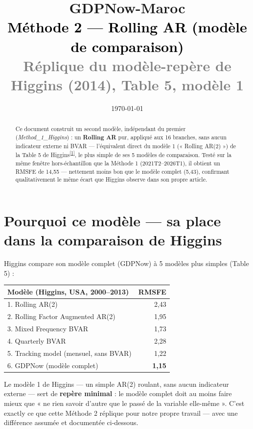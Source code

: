 \documentclass[11pt,a4paper]{article}
\title{\vspace{-1.3cm}\textcolor{violetmethode}{\Huge\bfseries GDPNow-Maroc}\\[0.3cm]
\textcolor{black}{\Large Méthode 2 --- Rolling AR (modèle de comparaison)}\\[0.15cm]
\textcolor{gray}{\large Réplique du modèle-repère de Higgins (2014), Table 5, modèle 1}}
\author{}
\date{\today}
\newcommand{\cit}[1]{\textsuperscript{\hyperlink{ref#1}{[#1]}}}
\begin{document}
\maketitle
\thispagestyle{empty}

\begin{abstract}
\noindent Ce document construit un second modèle, indépendant du premier (\emph{Method\_1\_Higgins}) : un \textbf{Rolling AR} pur, appliqué aux 16 branches, sans aucun indicateur externe ni BVAR --- l'équivalent direct du modèle 1 (« Rolling AR(2) ») de la Table 5 de Higgins\cit{1}, le plus simple de ses 5 modèles de comparaison. Testé sur la même fenêtre hors-échantillon que la Méthode 1 (2021T2--2026T1), il obtient un RMSFE de 14,55 --- nettement moins bon que le modèle complet (5,43), confirmant qualitativement le même écart que Higgins observe dans son propre article.
\end{abstract}

\tableofcontents
\vspace{0.5cm}

\section{Pourquoi ce modèle --- sa place dans la comparaison de Higgins}

\begin{definitionbox}
Higgins compare son modèle complet (GDPNow) à 5 modèles plus simples (Table 5) :
\begin{center}
\small
\begin{tabular}{lr}
\toprule
\textbf{Modèle (Higgins, USA, 2000--2013)} & \textbf{RMSFE} \\
\midrule
1. Rolling AR(2) & 2,43 \\
2. Rolling Factor Augmented AR(2) & 1,95 \\
3. Mixed Frequency BVAR & 1,73 \\
4. Quarterly BVAR & 2,28 \\
5. Tracking model (mensuel, sans BVAR) & 1,22 \\
6. GDPNow (modèle complet) & \textbf{1,15} \\
\bottomrule
\end{tabular}
\end{center}
\end{definitionbox}

\begin{intuition}
Le modèle 1 de Higgins --- un simple AR(2) roulant, sans aucun indicateur externe --- sert de \textbf{repère minimal} : le modèle complet doit au moins faire mieux que « ne rien savoir d'autre que le passé de la variable elle-même ». C'est exactly ce que cette Méthode 2 réplique pour notre propre travail --- avec une différence assumée et documentée ci-dessous.
\end{intuition}
\end{document}
